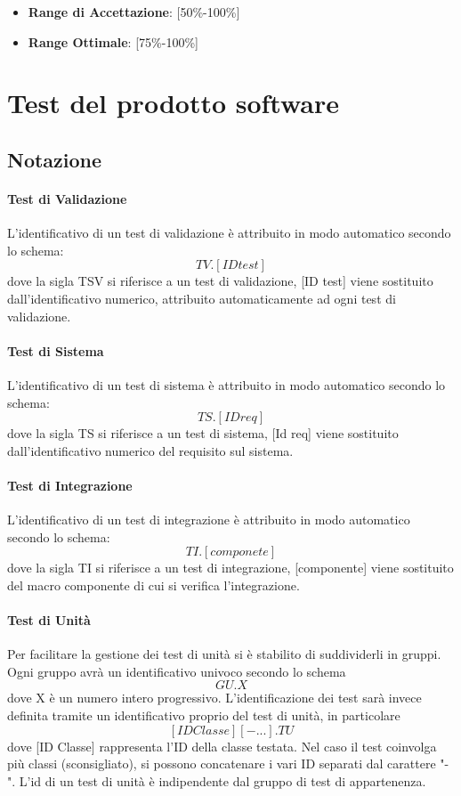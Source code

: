 \documentclass[12pt,a4paper]{article}
\begin{document}
	\begin{itemize}
		\item \textbf{Range di Accettazione}: [50\%-100\%]
		\item \textbf{Range Ottimale}: [75\%-100\%]
	\end{itemize}
	
	\newpage
	
	\section{Test del prodotto software}\label{test}
	\subsection{Notazione}
	\paragraph{Test di Validazione}
	L'identificativo di un test di validazione è attribuito in modo automatico secondo lo schema:
	\[ TV.[ID test ]\]
	dove la sigla TSV si riferisce a un test di validazione, [ID test] viene sostituito dall'identificativo numerico, attribuito automaticamente ad ogni test di validazione.
		
	\paragraph{Test di Sistema}
	L'identificativo di un test di sistema è attribuito in modo automatico secondo lo schema:
	\[ TS.[ID req]\]
	dove la sigla TS si riferisce a un test di sistema, [Id req] viene sostituito dall'identificativo numerico del requisito sul sistema.
	 
	\paragraph{Test di Integrazione}
	L'identificativo di un test di integrazione è attribuito in modo automatico secondo lo schema:
	\[ TI.[componete]\]
	dove la sigla TI si riferisce a un test di integrazione, [componente] viene sostituito del macro componente di cui si verifica l'integrazione.
	
	\paragraph{Test di Unità}
	Per facilitare la gestione dei test di unità si è stabilito di suddividerli in gruppi. Ogni gruppo avrà un identificativo univoco secondo lo schema	
	\[ GU.X  \]
	dove X è un numero intero progressivo. L'identificazione dei test sarà invece definita tramite un identificativo proprio del test di unità, in particolare
	\[ [ID Classe][- ...].TU \] 
	dove [ID Classe] rappresenta l'ID della classe testata. Nel caso il test coinvolga più classi (sconsigliato), si possono concatenare i vari ID separati dal carattere "-". L'id di un test di unità è indipendente dal gruppo di test di appartenenza.
	
\end{document}
